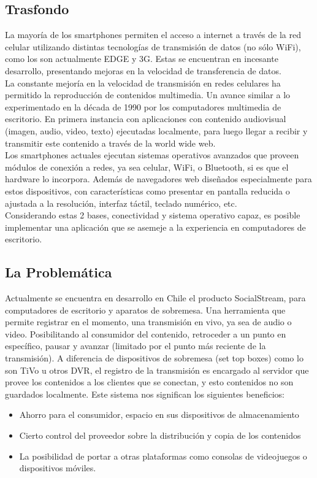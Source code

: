 \subsection{Trasfondo}
La mayoría de los smartphones permiten el acceso a internet a través de la red celular utilizando distintas tecnologías de transmisión de datos (no sólo WiFi), como los son actualmente EDGE y 3G. Estas se encuentran en incesante desarrollo, presentando mejoras en la velocidad de transferencia de datos.\\

La constante mejoría en la velocidad de transmisión en redes celulares ha permitido la reproducción de contenidos multimedia. Un avance similar a lo experimentado en la década de 1990 por los computadores multimedia de escritorio. En primera instancia con aplicaciones con contenido audiovisual (imagen, audio, video, texto) ejecutadas localmente, para luego llegar a recibir y transmitir este contenido a través de la world wide web.\\

Los smartphones actuales ejecutan sistemas operativos avanzados que proveen módulos de conexión  a redes, ya sea celular, WiFi, o Bluetooth, si es que el hardware lo incorpora. Además de navegadores web diseñados especialmente para estos dispositivos, con características como presentar en pantalla reducida o ajustada a la resolución, interfaz táctil, teclado numérico, etc.\\

Considerando estas 2 bases, conectividad y sistema operativo capaz, es posible implementar una aplicación que se asemeje a la experiencia en computadores de escritorio.\\

\subsection{La Problemática}
Actualmente se encuentra en desarrollo en Chile el producto SocialStream, para computadores de escritorio y aparatos de sobremesa. 
Una herramienta que permite registrar en el momento, una transmisión en vivo, ya sea de audio o video. Posibilitando al consumidor del contenido, retroceder a un punto en específico, pausar  y avanzar (limitado por el punto más reciente de la transmisión). 
A diferencia de dispositivos de sobremesa (set top boxes) como lo son TiVo u otros DVR, el registro de la transmisión es encargado al servidor que provee los contenidos a los clientes que se conectan, y esto contenidos no son guardados localmente.
Este sistema nos significan los siguientes beneficios: 
\begin{itemize}
\item Ahorro para el consumidor, espacio en sus dispositivos de almacenamiento
\item Cierto control del proveedor sobre la distribución  y copia de los contenidos
\item La posibilidad de portar a otras plataformas como consolas de videojuegos o dispositivos móviles.
\end{itemize}

